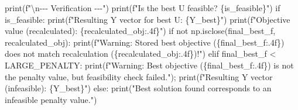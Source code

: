 \documentclass[
  letterpaper,
  DIV=11,
  numbers=noendperiod]{scrartcl}
\newenvironment{Shaded}{\begin{snugshade}}{\end{snugshade}}
\newcommand{\BuiltInTok}[1]{\textcolor[rgb]{0.00,0.23,0.31}{#1}}
\newcommand{\CharTok}[1]{\textcolor[rgb]{0.13,0.47,0.30}{#1}}
\newcommand{\ControlFlowTok}[1]{\textcolor[rgb]{0.00,0.23,0.31}{#1}}
\newcommand{\KeywordTok}[1]{\textcolor[rgb]{0.00,0.23,0.31}{#1}}
\newcommand{\NormalTok}[1]{\textcolor[rgb]{0.00,0.23,0.31}{#1}}
\newcommand{\OperatorTok}[1]{\textcolor[rgb]{0.37,0.37,0.37}{#1}}
\newcommand{\SpecialCharTok}[1]{\textcolor[rgb]{0.37,0.37,0.37}{#1}}
\newcommand{\SpecialStringTok}[1]{\textcolor[rgb]{0.13,0.47,0.30}{#1}}
\newcommand{\StringTok}[1]{\textcolor[rgb]{0.13,0.47,0.30}{#1}}
\begin{document}
\begin{Shaded}
\begin{Highlighting}[]
    \BuiltInTok{print}\NormalTok{(}\SpecialStringTok{f"}\CharTok{\textbackslash{}n}\SpecialStringTok{{-}{-}{-} Verification {-}{-}{-}"}\NormalTok{)}
    \BuiltInTok{print}\NormalTok{(}\SpecialStringTok{f"Is the best U feasible? }\SpecialCharTok{\{}\NormalTok{is\_feasible}\SpecialCharTok{\}}\SpecialStringTok{"}\NormalTok{)}
    \ControlFlowTok{if}\NormalTok{ is\_feasible:}
        \BuiltInTok{print}\NormalTok{(}\SpecialStringTok{f"Resulting Y vector for best U: }\SpecialCharTok{\{}\NormalTok{Y\_best}\SpecialCharTok{\}}\SpecialStringTok{"}\NormalTok{)}
        \BuiltInTok{print}\NormalTok{(}\SpecialStringTok{f"Objective value (recalculated): }\SpecialCharTok{\{}\NormalTok{recalculated\_obj}\SpecialCharTok{:.4f\}}\SpecialStringTok{"}\NormalTok{)}
        \ControlFlowTok{if} \KeywordTok{not}\NormalTok{ np.isclose(final\_best\_f, recalculated\_obj): }\BuiltInTok{print}\NormalTok{(}\SpecialStringTok{f"Warning: Stored best objective (}\SpecialCharTok{\{}\NormalTok{final\_best\_f}\SpecialCharTok{:.4f\}}\SpecialStringTok{) does not match recalculation (}\SpecialCharTok{\{}\NormalTok{recalculated\_obj}\SpecialCharTok{:.4f\}}\SpecialStringTok{)!"}\NormalTok{)}
    \ControlFlowTok{elif}\NormalTok{ final\_best\_f }\OperatorTok{\textless{}}\NormalTok{ LARGE\_PENALTY: }\BuiltInTok{print}\NormalTok{(}\SpecialStringTok{f"Warning: Best objective (}\SpecialCharTok{\{}\NormalTok{final\_best\_f}\SpecialCharTok{:.4f\}}\SpecialStringTok{) is not the penalty value, but feasibility check failed."}\NormalTok{)}\OperatorTok{;} \BuiltInTok{print}\NormalTok{(}\SpecialStringTok{f"Resulting Y vector (infeasible): }\SpecialCharTok{\{}\NormalTok{Y\_best}\SpecialCharTok{\}}\SpecialStringTok{"}\NormalTok{)}
    \ControlFlowTok{else}\NormalTok{: }\BuiltInTok{print}\NormalTok{(}\StringTok{"Best solution found corresponds to an infeasible penalty value."}\NormalTok{)}
\end{Highlighting}
\end{Shaded}
\end{document}

